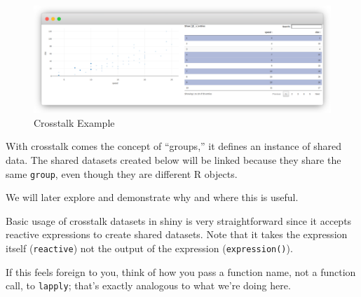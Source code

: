 \documentclass[
]{krantz}
\makeatletter
\newenvironment{Shaded}{\begin{snugshade}}{\end{snugshade}}
\newcommand{\DataTypeTok}[1]{\textcolor[rgb]{0.27,0.27,0.27}{#1}}
\newcommand{\KeywordTok}[1]{\textcolor[rgb]{0.27,0.27,0.27}{\textbf{#1}}}
\newcommand{\NormalTok}[1]{#1}
\newcommand{\OperatorTok}[1]{\textcolor[rgb]{0.43,0.43,0.43}{\textbf{#1}}}
\newcommand{\StringTok}[1]{\textcolor[rgb]{0.5,0.5,0.5}{#1}}
\renewenvironment{quote}{\begin{VF}}{\end{VF}}
\newenvironment{kframe}{%
\medskip{}
\setlength{\fboxsep}{.8em}
 \def\at@end@of@kframe{}%
 \ifinner\ifhmode%
  \def\at@end@of@kframe{\end{minipage}}%
  \begin{minipage}{\columnwidth}%
 \fi\fi%
 \def\FrameCommand##1{\hskip\@totalleftmargin \hskip-\fboxsep
 \colorbox{shadecolor}{##1}\hskip-\fboxsep
     \hskip-\linewidth \hskip-\@totalleftmargin \hskip\columnwidth}%
 \MakeFramed {\advance\hsize-\width
   \@totalleftmargin\z@ \linewidth\hsize
   \@setminipage}}%
 {\par\unskip\endMakeFramed%
 \at@end@of@kframe}
\renewenvironment{Shaded}{\begin{kframe}}{\end{kframe}}
\makeatother
\begin{document}
\begin{figure}
\centering
\includegraphics{images/crosstalk.png}
\caption{Crosstalk Example}
\end{figure}

With crosstalk comes the concept of ``groups,'' it defines an instance of shared data. The shared datasets created below will be linked because they share the same \texttt{group}, even though they are different R objects.

\begin{Shaded}
\end{Shaded}

We will later explore and demonstrate why and where this is useful.

Basic usage of crosstalk datasets in shiny is very straightforward since it accepts reactive expressions to create shared datasets. Note that it takes the expression itself (\texttt{reactive}) not the output of the expression (\texttt{expression()}).

\begin{quote}
If this feels foreign to you, think of how you pass a function name, not a function call, to \texttt{lapply}; that's exactly analogous to what we're doing here.

\end{quote}
\end{document}
